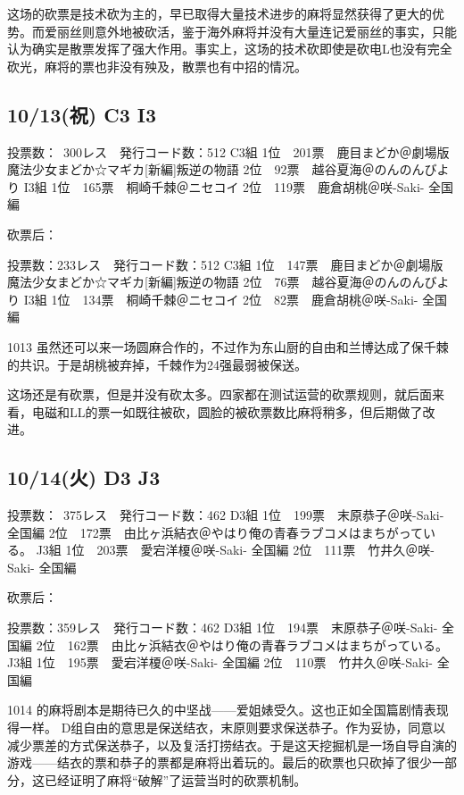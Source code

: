 这场的砍票是技术砍为主的，早已取得大量技术进步的麻将显然获得了更大的优势。而爱丽丝则意外地被砍活，鉴于海外麻将并没有大量连记爱丽丝的事实，只能认为确实是散票发挥了强大作用。事实上，这场的技术砍即使是砍电L也没有完全砍光，麻将的票也非没有殃及，散票也有中招的情况。

\subsection{10/13(祝) C3 I3}

	投票数：~300レス　発行コード数：512
	C3組
	1位　201票　鹿目まどか＠劇場版 魔法少女まどか☆マギカ[新編]叛逆の物語
	2位　92票　越谷夏海＠のんのんびより
	I3組
	1位　165票　桐崎千棘＠ニセコイ
	2位　119票　鹿倉胡桃＠咲-Saki- 全国編

砍票后：

	投票数：233レス　発行コード数：512
	C3組
	1位　147票　鹿目まどか＠劇場版 魔法少女まどか☆マギカ[新編]叛逆の物語
	2位　76票　越谷夏海＠のんのんびより
	I3組
	1位　134票　桐崎千棘＠ニセコイ
	2位　82票　鹿倉胡桃＠咲-Saki- 全国編

1013 虽然还可以来一场圆麻合作的，不过作为东山厨的自由和兰博达成了保千棘的共识。于是胡桃被弃掉，千棘作为24强最弱被保送。

这场还是有砍票，但是并没有砍太多。四家都在测试运营的砍票规则，就后面来看，电磁和LL的票一如既往被砍，圆脸的被砍票数比麻将稍多，但后期做了改进。

\subsection{10/14(火) D3 J3}

	投票数：~375レス　発行コード数：462
	D3組
	1位　199票　末原恭子＠咲-Saki- 全国編
	2位　172票　由比ヶ浜結衣＠やはり俺の青春ラブコメはまちがっている。
	J3組
	1位　203票　愛宕洋榎＠咲-Saki- 全国編
	2位　111票　竹井久＠咲-Saki- 全国編

砍票后：

	投票数：359レス　発行コード数：462
	D3組
	1位　194票　末原恭子＠咲-Saki- 全国編
	2位　162票　由比ヶ浜結衣＠やはり俺の青春ラブコメはまちがっている。
	J3組
	1位　195票　愛宕洋榎＠咲-Saki- 全国編
	2位　110票　竹井久＠咲-Saki- 全国編

1014 的麻将剧本是期待已久的中坚战——爱姐婊受久。这也正如全国篇剧情表现得一样。
D组自由的意思是保送结衣，末原则要求保送恭子。作为妥协，同意以减少票差的方式保送恭子，以及复活打捞结衣。于是这天挖掘机是一场自导自演的游戏——结衣的票和恭子的票都是麻将出着玩的。最后的砍票也只砍掉了很少一部分，这已经证明了麻将“破解”了运营当时的砍票机制。

